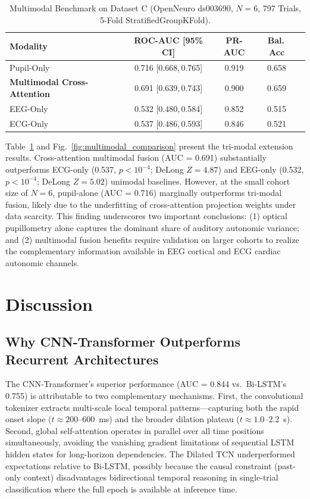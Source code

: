 \documentclass[journal]{IEEEtran}
\begin{document}
\begin{table}[t]
\centering
\small
\caption{Multimodal Benchmark on Dataset C (OpenNeuro ds003690, $N=6$, 797 Trials, 5-Fold StratifiedGroupKFold).}
\label{tab:multimodal_results}
\begin{tabular}{lcccc}
\toprule
\textbf{Modality} & \textbf{ROC-AUC [95\% CI]} & \textbf{PR-AUC} & \textbf{Bal.\,Acc} \\
\midrule
Pupil-Only                          & 0.716 [0.668,\,0.765] & 0.919 & 0.658 \\
\textbf{Multimodal Cross-Attention} & 0.691 [0.639,\,0.743] & 0.900 & 0.659 \\
EEG-Only                            & 0.532 [0.480,\,0.584] & 0.852 & 0.515 \\
ECG-Only                            & 0.537 [0.486,\,0.593] & 0.846 & 0.521 \\
\bottomrule
\end{tabular}
\end{table}

Table~\ref{tab:multimodal_results} and Fig.~\ref{fig:multimodal_comparison} present the tri-modal extension results. Cross-attention multimodal fusion (AUC = 0.691) substantially outperforms ECG-only (0.537, $p < 10^{-4}$; DeLong $Z = 4.87$) and EEG-only (0.532, $p < 10^{-4}$; DeLong $Z = 5.02$) unimodal baselines. However, at the small cohort size of $N = 6$, pupil-alone (AUC = 0.716) marginally outperforms tri-modal fusion, likely due to the underfitting of cross-attention projection weights under data scarcity. This finding underscores two important conclusions: (1) optical pupillometry alone captures the dominant share of auditory autonomic variance; and (2) multimodal fusion benefits require validation on larger cohorts to realize the complementary information available in EEG cortical and ECG cardiac autonomic channels.

\section{Discussion}

\subsection{Why CNN-Transformer Outperforms Recurrent Architectures}
The CNN-Transformer's superior performance (AUC = 0.844 vs.\ Bi-LSTM's 0.755) is attributable to two complementary mechanisms. First, the convolutional tokenizer extracts multi-scale local temporal patterns—capturing both the rapid onset slope ($t \approx 200\text{--}600$~ms) and the broader dilation plateau ($t \approx 1.0\text{--}2.2$~s). Second, global self-attention operates in parallel over all time positions simultaneously, avoiding the vanishing gradient limitations of sequential LSTM hidden states for long-horizon dependencies. The Dilated TCN underperformed expectations relative to Bi-LSTM, possibly because the causal constraint (past-only context) disadvantages bidirectional temporal reasoning in single-trial classification where the full epoch is available at inference time.
\end{document}
